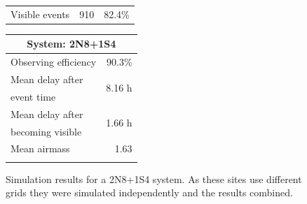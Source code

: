 \begin{colsection}
\begin{colsection}
\begin{figure}[p]
\begin{center}
\begin{minipage}[t]{0.45\textwidth}
\begin{tabular}{lrr}
                \midrule
                Visible events & 910 &  82.4\% \\
            \end{tabular}
        \end{minipage}
        \begin{minipage}[t]{0.37\textwidth}\vspace{0pt}
            \begin{tabular}{lr}
                \multicolumn{2}{c}{\textbf{System: 2N8+1S4}} \\
                \midrule
                Observing efficiency & 90.3\% \\
                \midrule
                Mean delay after     & \multirow{2}{*}{8.16 h} \\
                event time           & \\
                Mean delay after     & \multirow{2}{*}{1.66 h} \\
                becoming visible     & \\
                \midrule
                Mean airmass         & 1.63 \\
                & \\
            \end{tabular}
        \end{minipage}
    \end{center}
    \caption[GW simulation results: 2N8+1S4 system]{
        Simulation results for a 2N8+1S4 system. As these sites use different grids they were simulated independently and the results combined.
    }\label{fig:gw_sim_2n8+1s4}
\end{figure}


\end{colsection}
\end{colsection}
